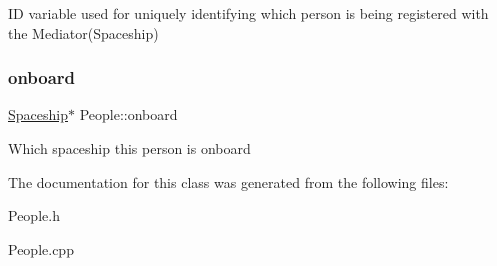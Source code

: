 ID variable used for uniquely identifying which person is being registered with the Mediator(\+Spaceship) \mbox{\label{classPeople_a103de9b80f0b47e01dc24ac48ec301b2}} 
\subsubsection{\texorpdfstring{onboard}{onboard}}
{\footnotesize\ttfamily \hyperlink{classSpaceship}{Spaceship}$\ast$ People\+::onboard\hspace{0.3cm}{\ttfamily [protected]}}

Which spaceship this person is onboard 

The documentation for this class was generated from the following files\+:\begin{DoxyCompactItemize}
\item 
People.\+h\item 
People.\+cpp\end{DoxyCompactItemize}
